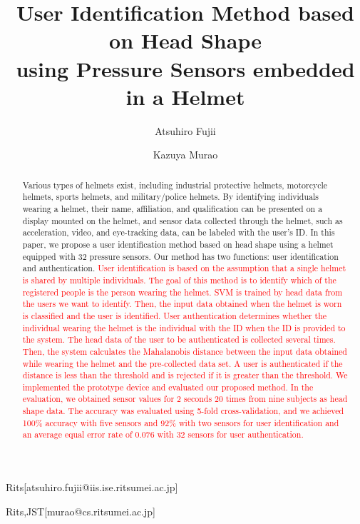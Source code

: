 \documentclass[english,preprint,JIP]{ipsj}
\begin{document}
\title{User Identification Method based on Head Shape\\
using Pressure Sensors embedded in a Helmet}


\author{Atsuhiro Fujii}{Rits}[atsuhiro.fujii@iis.ise.ritsumei.ac.jp]
\author{Kazuya Murao}{Rits,JST}[murao@cs.ritsumei.ac.jp]


\begin{abstract}
Various types of helmets exist, including industrial protective helmets, motorcycle helmets, sports helmets, and military/police helmets. By identifying individuals wearing a helmet, their name, affiliation, and qualification can be presented on a display mounted on the helmet, and sensor data collected through the helmet, such as acceleration, video, and eye-tracking data, can be labeled with the user's ID. In this paper, we propose a user identification method based on head shape using a helmet equipped with 32 pressure sensors. Our method has two functions: user identification and authentication. \textcolor{red}{User identification is based on the assumption that a single helmet is shared by multiple individuals. The goal of this method is to identify which of the registered people is the person wearing the helmet. SVM is trained by head data from the users we want to identify. Then, the input data obtained when the helmet is worn is classified and the user is identified. User authentication determines whether the individual wearing the helmet is the individual with the ID when the ID is provided to the system. The head data of the user to be authenticated is collected several times. Then, the system calculates the Mahalanobis distance between the input data obtained while wearing the helmet and the pre-collected data set. A user is authenticated if the distance is less than the threshold and is rejected if it is greater than the threshold. We implemented the prototype device and evaluated our proposed method. In the evaluation, we obtained sensor values for 2 seconds 20 times from nine subjects as head shape data. The accuracy was evaluated using 5-fold cross-validation, and we achieved 100\% accuracy with five sensors and 92\% with two sensors for user identification and an average equal error rate of 0.076 with 32 sensors for user authentication.}


\end{abstract}
\end{document}
